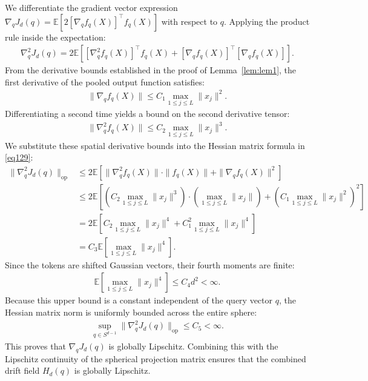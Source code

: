 \documentclass[11pt,a4paper]{article}
\theoremstyle{definition}
\begin{document}
We differentiate the gradient vector expression $\nabla_q J_d(q) = \mathbb{E}\left[ 2 \left[ \nabla_q f_q(X) \right]^\top f_q(X) \right]$ with respect to $q$. Applying the product rule inside the expectation:
\begin{align}
\nabla_q^2 J_d(q) = 2 \mathbb{E}\left[ \left[ \nabla_q^2 f_q(X) \right]^\top f_q(X) + \left[ \nabla_q f_q(X) \right]^\top \left[ \nabla_q f_q(X) \right] \right] \label{eq129}.
\end{align}
From the derivative bounds established in the proof of Lemma~\ref{lem:lem1}, the first derivative of the pooled output function satisfies:
\begin{align}
\| \nabla_q f_q(X) \| \le C_1 \max_{1 \le j \le L} \|x_j\|^2.
\end{align}
Differentiating a second time yields a bound on the second derivative tensor:
\begin{align}
\| \nabla_q^2 f_q(X) \| \le C_2 \max_{1 \le j \le L} \|x_j\|^3.
\end{align}
We substitute these spatial derivative bounds into the Hessian matrix formula in \eqref{eq129}:
\begin{align}
\| \nabla_q^2 J_d(q) \|_{\text{op}} &\le 2 \mathbb{E}\left[ \| \nabla_q^2 f_q(X) \| \cdot \|f_q(X)\| + \| \nabla_q f_q(X) \|^2 \right] \nonumber\\
&\le 2 \mathbb{E}\left[ \left( C_2 \max_{1 \le j \le L} \|x_j\|^3 \right) \cdot \left( \max_{1 \le j \le L} \|x_j\| \right) + \left( C_1 \max_{1 \le j \le L} \|x_j\|^2 \right)^2 \right] \nonumber\\
&= 2 \mathbb{E}\left[ C_2 \max_{1 \le j \le L} \|x_j\|^4 + C_1^2 \max_{1 \le j \le L} \|x_j\|^4 \right] \nonumber\\
&= C_3 \mathbb{E}\left[ \max_{1 \le j \le L} \|x_j\|^4 \right].
\end{align}
Since the tokens are shifted Gaussian vectors, their fourth moments are finite:
\begin{align}
\mathbb{E}\left[ \max_{1 \le j \le L} \|x_j\|^4 \right] \le C_4 d^2 < \infty.
\end{align}
Because this upper bound is a constant independent of the query vector $q$, the Hessian matrix norm is uniformly bounded across the entire sphere:
\begin{align}
\sup_{q \in S^{d-1}} \| \nabla_q^2 J_d(q) \|_{\text{op}} \le C_5 < \infty.
\end{align}
This proves that $\nabla_q J_d(q)$ is globally Lipschitz. Combining this with the Lipschitz continuity of the spherical projection matrix ensures that the combined drift field $H_d(q)$ is globally Lipschitz.
\end{document}
